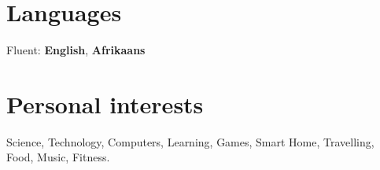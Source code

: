 \documentclass[a4paper,online,extended]{adcv}
\begin{document}
\section{Languages}

\ifextended

  \begin{adcvtablethree}
  \end{adcvtablethree}
  
\else
  Fluent: \textbf{English}, \textbf{Afrikaans}
\fi

  \section{Personal interests}

  Science, Technology, Computers, Learning, Games, Smart Home, Travelling, Food, Music, Fitness.

\end{document}
